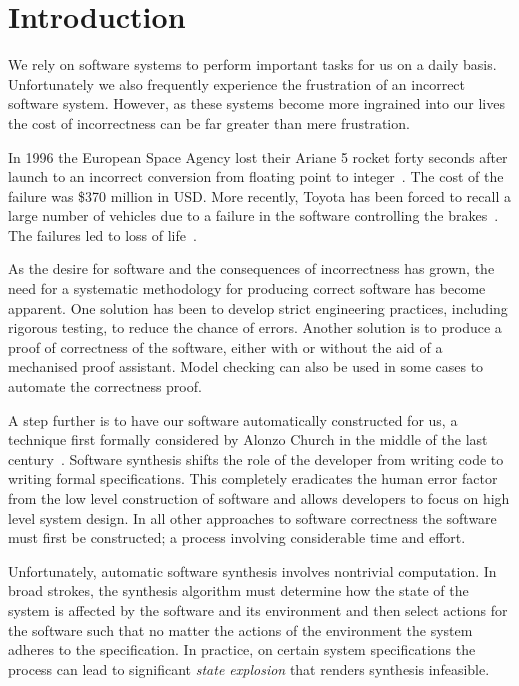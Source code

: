 \chapter{Introduction}

We rely on software systems to perform important tasks for us on a daily basis. Unfortunately we also frequently experience the frustration of an incorrect software system. However, as these systems become more ingrained into our lives the cost of incorrectness can be far greater than mere frustration.

In 1996 the European Space Agency lost their Ariane 5 rocket forty seconds after launch to an incorrect conversion from floating point to integer~\cite{Dowson97}. The cost of the failure was \$370 million in USD. More recently, Toyota has been forced to recall a large number of vehicles due to a failure in the software controlling the brakes~\cite{Parrish13}. The failures led to loss of life~\cite{CBS10}.

As the desire for software and the consequences of incorrectness has grown, the need for a systematic methodology for producing correct software has become apparent. One solution has been to develop strict engineering practices, including rigorous testing, to reduce the chance of errors. Another solution is to produce a proof of correctness of the software, either with or without the aid of a mechanised proof assistant. Model checking can also be used in some cases to automate the correctness proof.

A step further is to have our software automatically constructed for us, a technique first formally considered by Alonzo Church in the middle of the last century~\cite{Church62}. Software synthesis shifts the role of the developer from writing code to writing formal specifications. This completely eradicates the human error factor from the low level construction of software and allows developers to focus on high level system design. In all other approaches to software correctness the software must first be constructed; a process involving considerable time and effort.

Unfortunately, automatic software synthesis involves nontrivial computation. In broad strokes, the synthesis algorithm must determine how the state of the system is affected by the software and its environment and then select actions for the software such that no matter the actions of the environment the system adheres to the specification. In practice, on certain system specifications the process can lead to significant \emph{state explosion} that renders synthesis infeasible.

